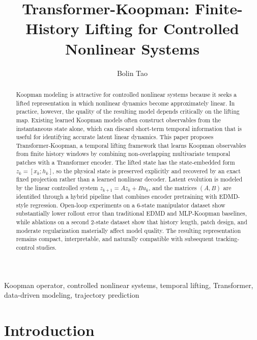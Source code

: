 \documentclass[journal]{IEEEtran}
\begin{document}
\title{Transformer-Koopman: Finite-History Lifting for Controlled Nonlinear Systems}

\author{Bolin Tao}


\maketitle

\begin{abstract}
Koopman modeling is attractive for controlled nonlinear systems because it seeks a lifted representation in which nonlinear dynamics become approximately linear. In practice, however, the quality of the resulting model depends critically on the lifting map. Existing learned Koopman models often construct observables from the instantaneous state alone, which can discard short-term temporal information that is useful for identifying accurate latent linear dynamics. This paper proposes Transformer-Koopman, a temporal lifting framework that learns Koopman observables from finite history windows by combining non-overlapping multivariate temporal patches with a Transformer encoder. The lifted state has the state-embedded form $z_k=[x_k;h_k]$, so the physical state is preserved explicitly and recovered by an exact fixed projection rather than a learned nonlinear decoder. Latent evolution is modeled by the linear controlled system $z_{k+1}=Az_k+Bu_k$, and the matrices $(A,B)$ are identified through a hybrid pipeline that combines encoder pretraining with EDMD-style regression. Open-loop experiments on a 6-state manipulator dataset show substantially lower rollout error than traditional EDMD and MLP-Koopman baselines, while ablations on a second 2-state dataset show that history length, patch design, and moderate regularization materially affect model quality. The resulting representation remains compact, interpretable, and naturally compatible with subsequent tracking-control studies.
\end{abstract}

\begin{IEEEkeywords}
Koopman operator, controlled nonlinear systems, temporal lifting, Transformer, data-driven modeling, trajectory prediction
\end{IEEEkeywords}

\section{Introduction}
\label{sec:introduction}
\end{document}
